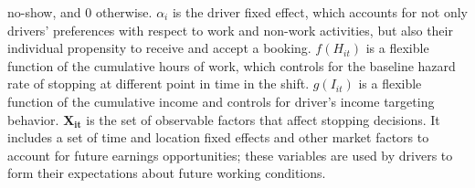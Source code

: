 \documentclass[reviewmode]{restat}
\begin{document}
no-show, and $0$ otherwise. $\alpha_i$ is the driver fixed effect, which accounts for not only drivers' 
preferences with respect to work and non-work activities, but also their individual propensity to receive 
and accept a booking. %
$f(H_{it})$ is a flexible function of the cumulative hours of work, which controls for the baseline 
hazard rate of stopping at different point in time in the shift. $g(I_{it})$ is a flexible function 
of the cumulative income and controls for driver's income targeting behavior. 
$\mathbf{X_{it}}$ is the set of observable factors that affect stopping decisions.  
It includes a set of time and location fixed effects and other market factors to account for 
future earnings opportunities; these variables are used by drivers to form their expectations 
about future working conditions.


\end{document}
